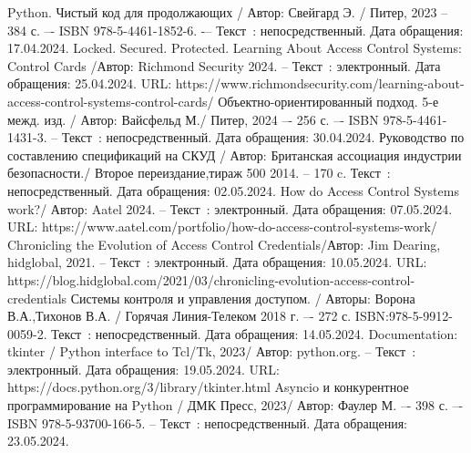 \begin{thebibliography}{9}
	Python. Чистый код для продолжающих / Автор: Свейгард Э. / Питер, 2023 – 384 с. –- ISBN 978-5-4461-1852-6. -– Текст~: непосредственный. Дата обращения: 17.04.2024.
	Locked. Secured. Protected. Learning About Access Control Systems: Control Cards /Автор: Richmond Security  2024.  – Текст~: электронный. Дата обращения: 25.04.2024. URL: https://www.richmondsecurity.com/learning-about-access-control-systems-control-cards/
	Объектно-ориентированный подход. 5-е межд. изд. / Автор: Вайсфельд М./ Питер, 2024 –- 256 с. –- ISBN 978-5-4461-1431-3. – Текст~: непосредственный. Дата обращения: 30.04.2024.
	Руководство по составлению спецификаций на СКУД / Автор: Британская ассоциация индустрии безопасности./ Второе переиздание,тираж 500 2014. -- 170 c. Текст~: непосредственный. Дата обращения: 02.05.2024.
	 How do Access Control Systems work?/ Автор: Aatel 2024. – Текст~: электронный. Дата обращения: 07.05.2024. URL: https://www.aatel.com/portfolio/how-do-access-control-systems-work/	
	Chronicling the Evolution of Access Control Credentials/Автор: Jim Dearing, hidglobal, 2021. – Текст~: электронный. Дата обращения: 10.05.2024. URL: https://blog.hidglobal.com/2021/03/chronicling-evolution-access-control-credentials
	Системы контроля и управления доступом. / Авторы: Ворона В.А.,Тихонов В.А. / Горячая Линия-Телеком 2018 г. –- 272 с. ISBN:978-5-9912-0059-2. Текст~: непосредственный. Дата обращения: 14.05.2024.
	Documentation: tkinter / Python interface to Tcl/Tk, 2023/ Автор: python.org. – Текст~: электронный. Дата обращения: 19.05.2024. URL: https://docs.python.org/3/library/tkinter.html
	 Asyncio и конкурентное программирование на Python / ДМК Пресс, 2023/ Автор: Фаулер М. –- 398 с. –- ISBN 978-5-93700-166-5. – Текст~: непосредственный.  Дата обращения: 23.05.2024.
	
\end{thebibliography}
